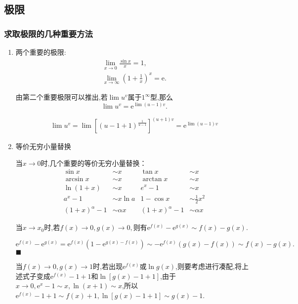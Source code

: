 \subsection{极限}
\subsubsection{求取极限的几种重要方法}
\begin{enumerate}
    \item 两个重要的极限:
\begin{align*}
    \lim_{x \to 0}\frac{\sin x}{x}=1,\\
    \lim_{x \to \infty}\left(1+\frac{1}{x}\right)^x=\mathrm{e}.
\end{align*}

由第二个重要极限可以推出,若$\lim u^v$属于$1^\infty$型,那么
\begin{equation*}
    \lim u^v=\mathrm{e}^{\lim (u-1)v}.
\end{equation*}

\begin{prf}
    \begin{gather*}
        \lim u^v=\lim \left[(u-1+1)^{\frac{1}{u-1}}\right]^{(u+1)v}=\mathrm{e}^{\lim (u-1)v}
    \end{gather*}
\end{prf}

\item 等价无穷小量替换

当$x\to 0$时,几个重要的等价无穷小量替换：
\begin{align*}
    \sin x &\sim x & \tan x &\sim x\\
    \arcsin x &\sim x & \arctan x &\sim x\\
    \ln(1+x) &\sim x & e^x-1 &\sim x\\
    a^x-1 &\sim x\ln a & 1-\cos x &\sim \frac{1}{2}x^2\\
    (1+x)^\alpha-1 &\sim \alpha x & (1+x)^\alpha-1 &\sim \alpha x
\end{align*}

当$x \to x_0 $时,若$f(x) \to 0, g(x) \to 0,$则有$\mathrm{e}^{f(x)}-\mathrm{e}^{g(x)}\sim f(x)-g(x).$


\zheng $\mathrm{e}^{f(x)}-\mathrm{e}^{g(x)}=\mathrm{e}^{f(x)}(1-\mathrm{e}^{g(x)-f(x)})\sim -\mathrm{e}^{f(x)}(g(x)-f(x))\sim f(x)-g(x).$\hfill$\blacksquare $

当$f(x) \to 0,g(x) \to 1 $时,若出现$\mathrm{e}^{f(x)}$或$\ln g(x)$,则要考虑进行凑配,将上述式子变成$\mathrm{e}^{f(x)}-1+1$和$\ln [g(x)-1+1]$,由于$x\to 0,\mathrm{e}^x-1\sim x, \ln (x+1)\sim x$,所以$\mathrm{e}^{f(x)}-1+1\sim f(x)+1,\ln [g(x)-1+1]\sim g(x)-1$.


\end{enumerate}
